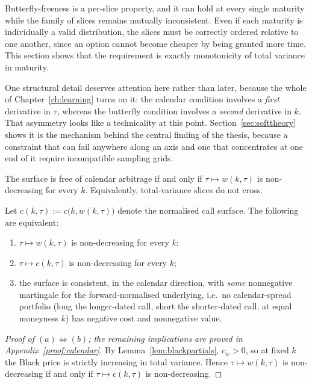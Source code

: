 Butterfly-freeness is a per-slice property, and it can hold at every single maturity while the
family of slices remains mutually inconsistent. Even if each maturity is individually a valid
distribution, the slices must be correctly ordered relative to one another, since an option
cannot become cheaper by being granted more time. This section shows that the requirement is
exactly monotonicity of total variance in maturity.

One structural detail deserves attention here rather than later, because the whole of
Chapter~\ref{ch:learning} turns on it: the calendar condition involves a \emph{first} derivative
in $\tau$, whereas the butterfly condition involves a \emph{second} derivative in $k$. That
asymmetry looks like a technicality at this point. Section~\ref{sec:softtheory} shows it is the
mechanism behind the central finding of the thesis, because a constraint that can fail anywhere
along an axis and one that concentrates at one end of it require incompatible sampling grids.

\begin{definition}\label{def:calendar}
The surface is free of calendar arbitrage if and only if
$\tau\mapsto w(k,\tau)$ is non-decreasing for every $k$. Equivalently, total-variance
slices do not cross.
\end{definition}

\begin{proposition}\label{prop:calendar}
Let $c(k,\tau):=c\bigl(k,w(k,\tau)\bigr)$ denote the normalised call surface. The following are
equivalent:
\begin{enumerate}[label=(\alph*)]
\item $\tau\mapsto w(k,\tau)$ is non-decreasing for every $k$;
\item $\tau\mapsto c(k,\tau)$ is non-decreasing for every $k$;
\item the surface is consistent, in the calendar direction, with \emph{some} nonnegative
martingale for the forward-normalised underlying, i.e.\ no calendar-spread portfolio (long the
longer-dated call, short the shorter-dated call, at equal moneyness $k$) has negative cost and
nonnegative value.
\end{enumerate}
\end{proposition}

\begin{proof}[Proof of $(a)\iff(b)$; the remaining implications are proved in
Appendix~\ref{proof:calendar}]
By Lemma~\ref{lem:blackpartials}, $c_w>0$, so at fixed $k$ the Black price is strictly
increasing in total variance. Hence $\tau\mapsto w(k,\tau)$ is non-decreasing if and only if
$\tau\mapsto c(k,\tau)$ is non-decreasing.
\end{proof}

